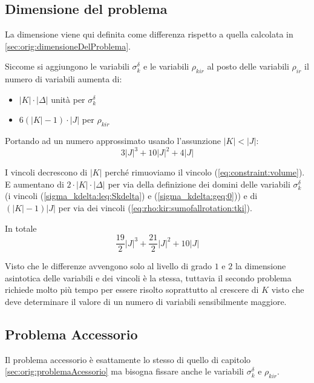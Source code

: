 \subsection{Dimensione del problema}

La dimensione viene qui definita come differenza rispetto a quella calcolata in
\ref{sec:orig:dimensioneDelProblema}.

Siccome si aggiungono le variabili $\sigma_k^\delta$ e le variabili $\rho_{kir}$
al posto delle variabili $\rho_{ir}$ il numero di variabili aumenta di:
\begin{itemize}
	\item $|K|\cdot|\Delta|$ unità per $\sigma_k^\delta$
	
	\item $6(|K|-1)\cdot |J|$ per $\rho_{kir}$
\end{itemize} 

Portando ad un numero approssimato usando l'assunzione $|K| < |J|$:
$$
3|J|^3 + 10|J|^2 + 4|J| 
$$


I vincoli decrescono di $|K|$ perché rimuoviamo il vincolo
(\ref{eq:constraint:volume}). E aumentano di $2 \cdot |K|\cdot|\Delta|$ per via
della definizione dei domini delle variabili $\sigma_k^\delta$ 
(i vincoli (\ref{sigma_kdelta:leq:Skdelta}) e (\ref{sigma_kdelta:geq:0})) e 
di $(|K|-1) |J|$ per via dei vincoli (\ref{eq:rho:kir:sumofallrotation:tki}).

In totale
$$
\frac{19}{2} |J|^3 + \frac{21}{2} |J|^2 + 10|J|
$$


Visto che le differenze avvengono solo al livello di grado $1$ e $2$ la
dimensione asintotica delle variabili e dei vincoli è la stessa, tuttavia il
secondo problema richiede molto più tempo per essere risolto soprattutto al
crescere di $K$ visto che deve determinare il valore di un numero di variabili
sensibilmente maggiore.


\subsection{Problema Accessorio}

Il problema accessorio è esattamente lo stesso di quello di capitolo 
\ref{sec:orig:problemaAcessorio} ma bisogna fissare anche le variabili
$\sigma_k^\delta$ e $\rho_{kir}$.



